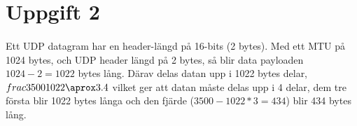 \section{Uppgift 2}
\paragraph{}
Ett UDP datagram har en header-längd på 16-bits (2 bytes). 
Med ett MTU på 1024 bytes, och UDP header längd på 2 bytes, så blir data payloaden 
$1024-2=1022$ bytes lång. Därav delas datan upp i 1022 bytes delar, $ frac{3500}{1022}\aprox 3.4 $
vilket ger att datan måste delas upp i 4 delar, dem tre första blir 1022 bytes långa och den fjärde 
($ 3500 - 1022*3 = 434 $) blir 434 bytes lång.

